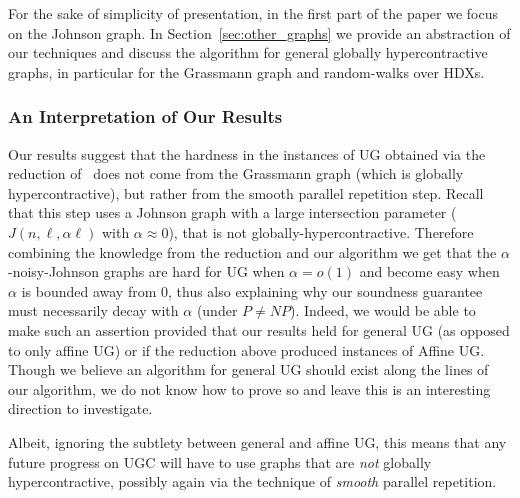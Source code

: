 For the sake 
of simplicity of presentation, in the first part of the paper we focus
on the Johnson graph. In Section~\ref{sec:other_graphs} we provide an abstraction of our techniques and discuss the algorithm for general globally hypercontractive graphs, in particular for the Grassmann graph and random-walks over HDXs.


\subsubsection*{An Interpretation of Our Results}\label{sec:interpretation}
Our results suggest that the hardness in 
the instances of UG obtained via the reduction  of~\cite{KhotMS17,DBLP:conf/stoc/DinurKKMS18a,DinurKKMS18,KhotMS18} does not come from
the Grassmann graph (which is globally 
hypercontractive), but rather from the smooth parallel repetition step. Recall that this step uses a Johnson graph with a large intersection
parameter ($J(n,\ell,\alpha\ell)$ with $\alpha \approx 0$), that is not globally-hypercontractive. Therefore combining the knowledge from the reduction and our algorithm we get that the $\alpha$-noisy-Johnson graphs are hard for UG when $\alpha = o(1)$ and become easy when $\alpha$ is bounded away from $0$, thus also explaining why our soundness guarantee must necessarily decay with $\alpha$ (under $P \neq NP$). Indeed, we would be able to make such an assertion provided that our
results held for general UG (as opposed to only affine UG) or if the reduction above produced  instances of Affine UG. Though
we believe an algorithm for general UG should exist along the lines of our algorithm, we 
do not know how to prove so and leave this is 
an interesting direction to investigate. 

Albeit, ignoring the subtlety between general and affine UG, this means that any future progress on UGC will have to use graphs that are \emph{not} 
globally hypercontractive, possibly again 
via the technique of \emph{smooth} parallel repetition. 


